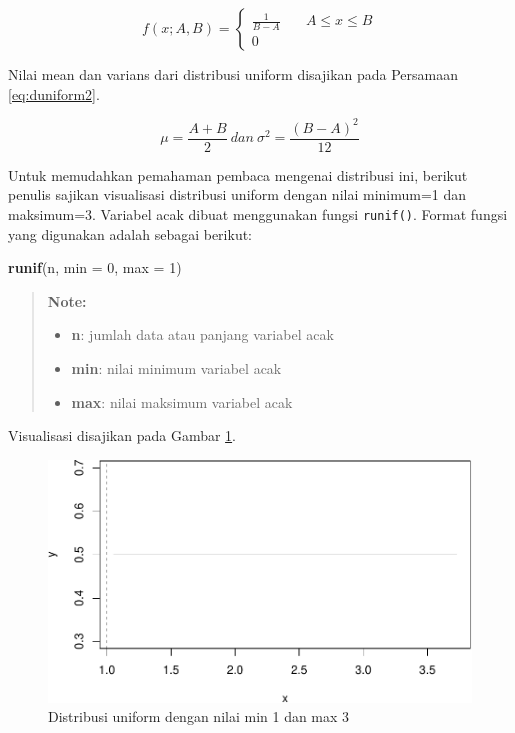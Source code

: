 \documentclass[]{book}
\newenvironment{Shaded}{\begin{snugshade}}{\end{snugshade}}
\newcommand{\KeywordTok}[1]{\textcolor[rgb]{0.13,0.29,0.53}{\textbf{#1}}}
\newcommand{\DataTypeTok}[1]{\textcolor[rgb]{0.13,0.29,0.53}{#1}}
\newcommand{\DecValTok}[1]{\textcolor[rgb]{0.00,0.00,0.81}{#1}}
\newcommand{\NormalTok}[1]{#1}
\providecommand{\tightlist}{%
  \setlength{\itemsep}{0pt}\setlength{\parskip}{0pt}}
\begin{document}
\begin{equation}
f(x;A,B) =
  \begin{cases}
    \frac{1}{B-A}       & \quad A\le x\le B\\
    0                   & \quad\text{}
    \end{cases}
 \label{eq:duniform}
\end{equation}

Nilai mean dan varians dari distribusi uniform disajikan pada Persamaan
\eqref{eq:duniform2}.

\begin{equation}
   \mu=\frac{A+B}{2}\ dan\ \sigma^2=\frac{\left(B-A\right)^2}{12}
  \label{eq:duniform2}
\end{equation}

Untuk memudahkan pemahaman pembaca mengenai distribusi ini, berikut
penulis sajikan visualisasi distribusi uniform dengan nilai minimum=1
dan maksimum=3. Variabel acak dibuat menggunakan fungsi
\texttt{runif()}. Format fungsi yang digunakan adalah sebagai berikut:

\begin{Shaded}
\begin{Highlighting}[]
\KeywordTok{runif}\NormalTok{(n, }\DataTypeTok{min =} \DecValTok{0}\NormalTok{, }\DataTypeTok{max =} \DecValTok{1}\NormalTok{)}
\end{Highlighting}
\end{Shaded}

\begin{quote}
\textbf{Note: }

\begin{itemize}
\tightlist
\item
  \textbf{n}: jumlah data atau panjang variabel acak
\item
  \textbf{min}: nilai minimum variabel acak
\item
  \textbf{max}: nilai maksimum variabel acak
\end{itemize}
\end{quote}

Visualisasi disajikan pada Gambar \ref{fig:uniformvis}.

\begin{figure}

{\centering \includegraphics[width=0.7\linewidth]{EnvStat_files/figure-latex/uniformvis-1} 

}

\caption{Distribusi uniform dengan nilai min 1 dan max 3}\label{fig:uniformvis}
\end{figure}
\end{document}
